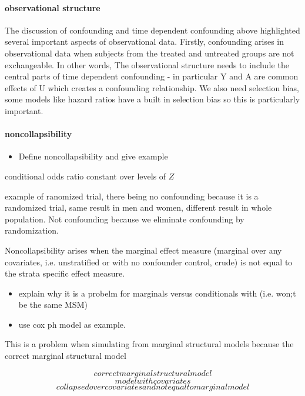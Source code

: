 \documentclass[11pt]{article}
\providecommand{\tightlist}{%
      \setlength{\itemsep}{0pt}\setlength{\parskip}{0pt}}
\begin{document}
\paragraph{observational structure}\label{observational-structure}

The discussion of confounding and time dependent confounding above
highlighted several important aspects of observational data. Firstly,
confounding arises in observational data when subjects from the treated
and untreated groups are not exchangeable. In other words, The
observational structure needs to include the central parts of time
dependent confounding - in particular Y and A are common effects of U
which creates a confounding relationship. We also need selection bias,
some models like hazard ratios have a built in selection bias so this is
particularly important.

\paragraph{noncollapsibility}\label{noncollapsibility}

\begin{itemize}
\tightlist
\item
  Define noncollapsibility and give example
\end{itemize}

conditional odds ratio constant over levels of \(Z\)

example of ranomized trial, there being no confounding because it is a
randomized trial, same result in men and women, different result in
whole population. Not confounding because we eliminate confounding by
randomization.

Noncollapsibility arises when the marginal effect measure (marginal over
any covariates, i.e. unstratified or with no confounder control, crude)
is not equal to the strata specific effect measure.

\begin{itemize}
\tightlist
\item
  explain why it is a probelm for marginals versus conditionals with
  (i.e. won;t be the same MSM)
\item
  use cox ph model as example.
\end{itemize}

This is a problem when simulating from marginal structural models
because the correct marginal structural model

\[correct marginal structural model\] \[model with covariates\]
\[collapsed over covariates and not equal to marginal model\]
\end{document}
